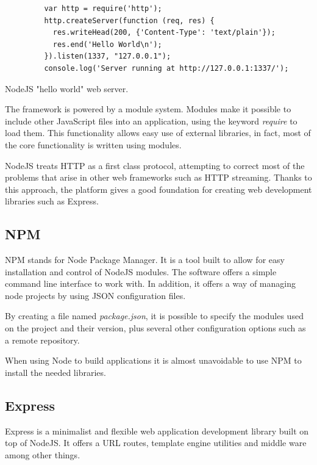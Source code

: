 \begin{listing}\centering
  \begin{minipage}{.6\textwidth}
    \begin{verbatim}
	     var http = require('http');
	     http.createServer(function (req, res) {
	       res.writeHead(200, {'Content-Type': 'text/plain'});
	       res.end('Hello World\n');
	     }).listen(1337, "127.0.0.1");
	     console.log('Server running at http://127.0.0.1:1337/');
    \end{verbatim}
  \end{minipage}
  \caption{NodeJS "hello world" web server.}\label{lst:node1}
\end{listing}

The framework is powered by a module system. Modules make it possible to include other JavaScript files into an application, using the keyword \textit{require} to load them. This functionality allows easy use of external libraries, in fact, most of the core functionality is written using modules.

NodeJS treats HTTP as a first class protocol, attempting to correct most of the problems that arise in other web frameworks such as HTTP streaming. Thanks to this approach, the platform gives a good foundation for creating web development libraries such as Express.

\subsection*{NPM}

NPM stands for Node Package Manager. It is a tool built to allow for easy installation and control of NodeJS modules. The software offers a simple command line interface to work with. In addition, it offers a way of managing node projects by using JSON configuration files.

By creating a file named \textit{package.json}, it is possible to specify the modules used on the project and their version, plus several other configuration options such as a remote repository.

When using Node to build applications it is almost unavoidable to use NPM to install the needed libraries.

\subsection*{Express}

Express is a minimalist and flexible web application development library built on top of NodeJS. It offers a URL routes, template engine utilities and middle ware among other things. 


